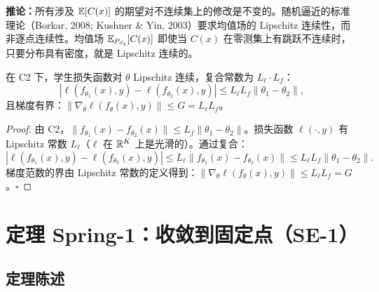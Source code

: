 \textbf{推论：}所有涉及 $\mathbb{E}[C(x)]$ 的期望对不连续集上的修改是不变的。随机逼近的标准理论（Borkar, 2008; Kushner \& Yin, 2003）要求均值场的 Lipschitz 连续性，而非逐点连续性。均值场 $\mathbb{E}_{P_{S_t}}[C(x)]$ 即使当 $C(x)$ 在零测集上有跳跃不连续时，只要分布具有密度，就是 Lipschitz 连续的。

\begin{lemma}[Lipschitz 复合]\label{lem:comp}
在 C2 下，学生损失函数对 $\theta$ Lipschitz 连续，复合常数为 $L_\ell \cdot L_f$：
\begin{equation}
    |\ell(f_{\theta_1}(x), y) - \ell(f_{\theta_2}(x), y)| \leq L_\ell L_f \|\theta_1 - \theta_2\|,
\end{equation}
且梯度有界：$\|\nabla_\theta \ell(f_\theta(x), y)\| \leq G = L_\ell L_f$。
\end{lemma}

\begin{proof}
由 C2，$\|f_{\theta_1}(x) - f_{\theta_2}(x)\| \leq L_f \|\theta_1 - \theta_2\|$。损失函数 $\ell(\cdot, y)$ 有 Lipschitz 常数 $L_\ell$（$\ell$ 在 $\mathbb{R}^K$ 上是光滑的）。通过复合：
\begin{equation}
    |\ell(f_{\theta_1}(x), y) - \ell(f_{\theta_2}(x), y)| \leq L_\ell \|f_{\theta_1}(x) - f_{\theta_2}(x)\| \leq L_\ell L_f \|\theta_1 - \theta_2\|.
\end{equation}
梯度范数的界由 Lipschitz 常数的定义得到：$\|\nabla_\theta \ell(f_\theta(x), y)\| \leq L_\ell L_f = G$。\hfill $\square$
\end{proof}

\section{定理 Spring-1：收敛到固定点（SE-1）}\label{sec:spring1}

\subsection{定理陈述}

